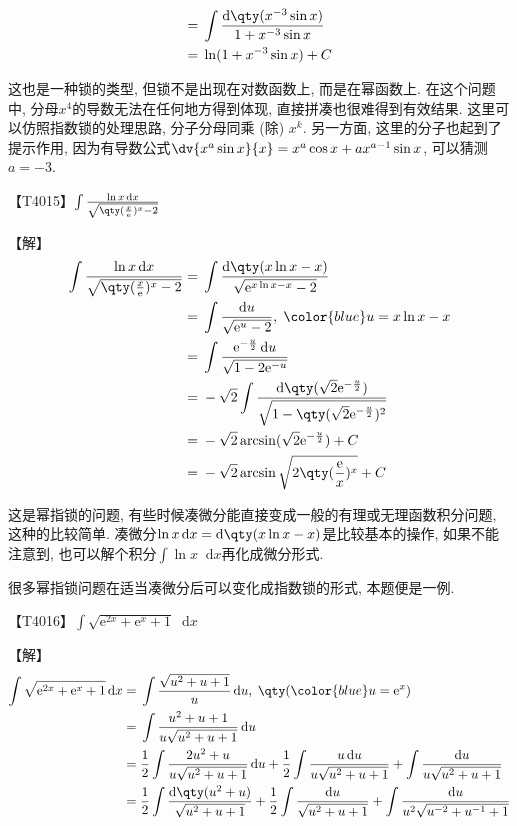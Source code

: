 \documentclass{ctexbook}
\newcommand{\e}{\mathrm{e}}
\newcommand*{\dif}{\mathop{}\!\mathrm{d}}
\begin{document}
{\begin{align*}
={}&\int\frac{\dif{\qty(x^{-3}\sin{x})}}{1+x^{-3}\sin{x}}\\
={}&\ln(1+x^{-3}\sin{x})+C
\end{align*}\par
{\kaishu 这也是一种锁的类型, 但锁不是出现在对数函数上, 而是在幂函数上. 在这个问题中, 分母$x^{4}$的导数无法在任何地方得到体现, 直接拼凑也很难得到有效结果. 这里可以仿照指数锁的处理思路, 分子分母同乘 (除) $x^{k}$. 另一方面, 这里的分子也起到了提示作用, 因为有导数公式$\dv{x^{a}\sin{x}}{x}=x^{a}\cos{x}+ax^{a-1}\sin{x}$, 可以猜测$a=-3$. \par}
【T4015】$\int\frac{\ln{x}\dif{x}}{\sqrt{\qty(\frac{x}{\e})^{x}-2}}$\par
【解】
\begin{align*}
\int\frac{\ln{x}\dif{x}}{\sqrt{\qty(\frac{x}{\e})^{x}-2}}={}&\int\frac{\dif{\qty(x\ln{x}-x)}}{\sqrt{\e^{x\ln{x}-x}-2}}\\
={}&\int\frac{\dif{u}}{\sqrt{\e^{u}-2}},\;{\color{blue}u=x\ln{x}-x}\\
={}&\int\frac{\e^{-\frac{u}{2}}\dif{u}}{\sqrt{1-2\e^{-u}}}\\
={}&-\sqrt{2}\int\frac{\dif{\qty(\sqrt{2}\e^{-\frac{u}{2}})}}{\sqrt{1-\qty(\sqrt{2}\e^{-\frac{u}{2}})^{2}}}\\
={}&-\sqrt{2}\arcsin(\sqrt{2}\e^{-\frac{u}{2}})+C\\
={}&-\sqrt{2}\arcsin{\sqrt{2\qty(\frac{\e}{x})^{x}}}+C
\end{align*}\par
{\kaishu 这是幂指锁的问题, 有些时候凑微分能直接变成一般的有理或无理函数积分问题, 这种的比较简单. 凑微分$\ln{x}\dif{x}=\dif{\qty(x\ln{x}-x)}$是比较基本的操作, 如果不能注意到, 也可以解个积分$\int\ln{x}\dif{x}$再化成微分形式. \par
很多幂指锁问题在适当凑微分后可以变化成指数锁的形式, 本题便是一例. \par}
【T4016】$\int\sqrt{\e^{2x}+\e^{x}+1}\dif{x}$\par
【解】
\begin{align*}
\int\sqrt{\e^{2x}+\e^{x}+1}\dif{x}={}&\int\frac{\sqrt{u^{2}+u+1}}{u}\dif{u},\;\qty(\color{blue}u=\e^{x})\\
={}&\int\frac{u^{2}+u+1}{u\sqrt{u^{2}+u+1}}\dif{u}\\
={}&\frac{1}{2}\int\frac{2u^{2}+u}{u\sqrt{u^{2}+u+1}}\dif{u}+\frac{1}{2}\int\frac{u\dif{u}}{u\sqrt{u^{2}+u+1}}+\int\frac{\dif{u}}{u\sqrt{u^{2}+u+1}}\\
={}&\frac{1}{2}\int\frac{\dif{\qty(u^{2}+u)}}{\sqrt{u^{2}+u+1}}+\frac{1}{2}\int\frac{\dif{u}}{\sqrt{u^{2}+u+1}}+\int\frac{\dif{u}}{u^{2}\sqrt{u^{-2}+u^{-1}+1}}\\

\end{align*}}
\end{document}
